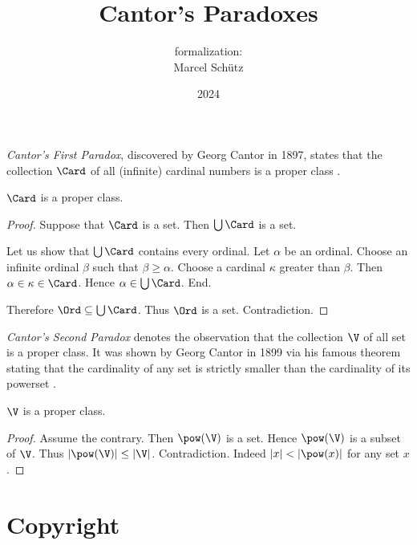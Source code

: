 \documentclass{article}
\title{Cantor's Paradoxes}
\author{\Naproche formalization: \\[0.5em]Marcel Schütz}
\date{2024}
\begin{document}
  \maketitle


  \begin{forthel}
  \end{forthel}

  \noindent \emph{Cantor's First Paradox}, discovered by Georg Cantor in 1897,
  states that the collection $\Card$ of all (infinite) cardinal numbers is a
  proper class \cite[chapter 156]{Cantor1991}.

  \begin{forthel}
    \begin{theorem*}[title=Cantor's First Paradox,id=cantor_paradox_1]
      $\Card$ is a proper class.
    \end{theorem*}
    \begin{proof}
      Suppose that $\Card$ is a set.
      Then $\bigcup \Card$ is a set.

      Let us show that $\bigcup \Card$ contains every ordinal.
        Let $\alpha$ be an ordinal.
        Choose an infinite ordinal $\beta$ such that $\beta \geq \alpha$.
        Choose a cardinal $\kappa$ greater than $\beta$.
        Then $\alpha \in \kappa \in \Card$.
        Hence $\alpha \in \bigcup \Card$.
      End.

      Therefore $\Ord \subseteq \bigcup \Card$.
      Thus $\Ord$ is a set.
      Contradiction.
    \end{proof}
  \end{forthel}

  \emph{Cantor's Second Paradox} denotes the observation that the collection
  $\V$ of all set is a proper class.
  It was shown by Georg Cantor in 1899 via his famous theorem stating that the
  cardinality of any set is strictly smaller than the cardinality of its 
  powerset \cite[chapter 163]{Cantor1991}.

  \begin{forthel}
    \begin{theorem*}[title=Cantor's Second Paradox,id=cantor_paradox_2]
      $\V$ is a proper class.
    \end{theorem*}
    \begin{proof}
      Assume the contrary.
      Then $\pow(\V)$ is a set.
      Hence $\pow(\V)$ is a subset of $\V$.
      Thus $|\pow(\V)| \leq |\V|$.
      Contradiction.
      Indeed $|x| < |\pow(x)|$ for any set $x$.
    \end{proof}
  \end{forthel}

  \printbibliography

  \section*{Copyright}
  \doclicenseThis
\end{document}
